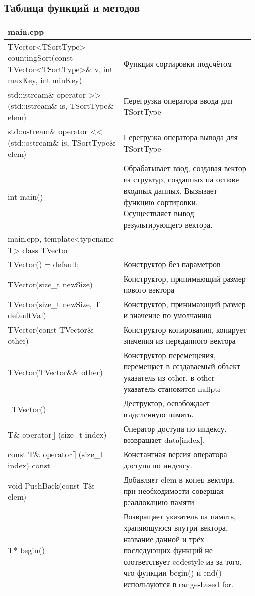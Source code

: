 \subsection{Таблица функций и методов}
\begin{longtable}{|p{7.5cm}|p{7.5cm}|}
\hline
\rowcolor{lightgray}
\multicolumn{2}{|c|} {main.cpp}\\
\hline 
TVector<TSortType> countingSort(const TVector<TSortType>\& v,  int maxKey, int minKey)&Функция сортировки подсчётом\\
\hline
std::istream\& operator >> (std::istream\& is, TSortType\& elem)&Перегрузка оператора ввода для TSortType\\
\hline
std::ostream\& operator << (std::ostream\& is, TSortType\& elem)&Перегрузка оператора вывода для TSortType\\
\hline
int main() &Обрабатывает ввод, создавая вектор из структур, созданных на основе входных данных. Вызывает функцию сортировки. Осуществляет вывод результирующего вектора.\\
\hline
\hline
\rowcolor{lightgray}
\multicolumn{2}{|c|} {main.cpp, template<typename T> class TVector}\\
\hline
TVector() = default; & Конструктор без параметров\\
\hline
TVector(size\_t newSize) & Конструктор, принимающий размер нового вектора\\
\hline
TVector(size\_t newSize, T defaultVal) &Конструктор, принимающий размер и значение по умолчанию\\
\hline 
TVector(const TVector\& other)&Конструктор копирования, копирует значения из переданного вектора\\
\hline
TVector(TVector\&\& other)& Конструктор перемещения, перемещает в создаваемый объект указатель из other, в other указатель становится nullptr\\
\hline
~TVector() & Деструктор, освобождает выделенную память.\\
\hline 
T\& operator[] (size\_t index)& Оператор доступа по индексу, возвращает data[index].\\
\hline 
const T\& operator[] (size\_t index) const& Константная версия оператора доступа по индексу.\\
\hline
void PushBack(const T\& elem)&Добавляет elem в конец вектора, при необходимости совершая реаллокацию памяти\\
\hline 
T* begin()& Возвращает указатель на память, храняющуюся внутри вектора, название данной и трёх последующих функций не соответствует codestyle из-за того, что функции begin() и end() используются в range-based for.\\

\end{longtable}
